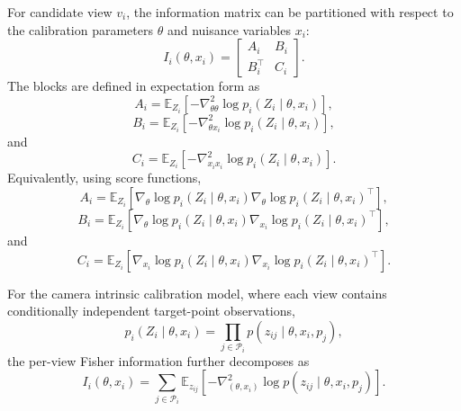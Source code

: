 \documentclass[letterpaper, 9
 pt, conference]{ieeeconf}
\begin{document}
For candidate view $v_i$, the information matrix can be partitioned with respect to the calibration parameters $\theta$ and nuisance variables $x_i$:
\begin{equation}
    I_i(\theta,x_i)
    =
    \begin{bmatrix}
        A_i & B_i\\
        B_i^\top & C_i
    \end{bmatrix}.
\end{equation}
The blocks are defined in expectation form as
\begin{equation}
    A_i
    =
    \mathbb{E}_{Z_i}
    \left[
    -
    \nabla_{\theta\theta}^{2}
    \log p_i(Z_i\mid \theta,x_i)
    \right],
\end{equation}
\begin{equation}
    B_i
    =
    \mathbb{E}_{Z_i}
    \left[
    -
    \nabla_{\theta x_i}^{2}
    \log p_i(Z_i\mid \theta,x_i)
    \right],
\end{equation}
and
\begin{equation}
    C_i
    =
    \mathbb{E}_{Z_i}
    \left[
    -
    \nabla_{x_i x_i}^{2}
    \log p_i(Z_i\mid \theta,x_i)
    \right].
\end{equation}
Equivalently, using score functions,
\begin{equation}
    A_i
    =
    \mathbb{E}_{Z_i}
    \left[
    \nabla_{\theta}
    \log p_i(Z_i\mid \theta,x_i)
    \nabla_{\theta}
    \log p_i(Z_i\mid \theta,x_i)^\top
    \right],
\end{equation}
\begin{equation}
    B_i
    =
    \mathbb{E}_{Z_i}
    \left[
    \nabla_{\theta}
    \log p_i(Z_i\mid \theta,x_i)
    \nabla_{x_i}
    \log p_i(Z_i\mid \theta,x_i)^\top
    \right],
\end{equation}
and
\begin{equation}
    C_i
    =
    \mathbb{E}_{Z_i}
    \left[
    \nabla_{x_i}
    \log p_i(Z_i\mid \theta,x_i)
    \nabla_{x_i}
    \log p_i(Z_i\mid \theta,x_i)^\top
    \right].
\end{equation}

For the camera intrinsic calibration model, where each view contains conditionally independent target-point observations,
\begin{equation}
    p_i(Z_i\mid \theta,x_i)
    =
    \prod_{j\in\mathcal{P}_i}
    p(z_{ij}\mid \theta,x_i,p_j),
\end{equation}
the per-view Fisher information further decomposes as
\begin{equation}
    I_i(\theta,x_i)
    =
    \sum_{j\in\mathcal{P}_i}
    \mathbb{E}_{z_{ij}}
    \left[
    -
    \nabla_{(\theta,x_i)}^{2}
    \log p(z_{ij}\mid \theta,x_i,p_j)
    \right].
\end{equation}
\end{document}
